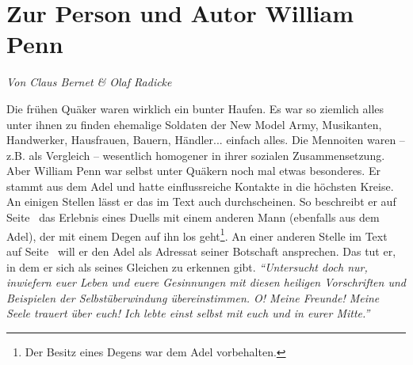 %
%
%



\section{Zur Person und Autor William Penn} \label{ref:zum_autor_penn}

\begin{flushright}
\begin{footnotesize}
\textit{Von Claus Bernet \& Olaf Radicke}
\end{footnotesize}
\end{flushright}
\smallskip

Die frühen Quäker waren wirklich ein bunter Haufen. Es war so ziemlich alles
unter ihnen zu finden ehemalige Soldaten der New Model Army, Musikanten, Handwerker, Hausfrauen, Bauern, Händler... einfach alles.
Die Mennoiten  waren --
z.B. als Vergleich -- wesentlich homogener in ihrer sozialen Zusammensetzung.
Aber
William Penn war selbst unter Quäkern noch mal etwas besonderes. Er stammt aus
dem Adel und hatte einflussreiche Kontakte in die höchsten Kreise. An einigen
Stellen lässt er das im Text auch durchscheinen. So beschreibt er auf
Seite~\pageref{kap9_ab2_duell_penn} das Erlebnis eines Duells
mit einem anderen Mann (ebenfalls aus dem Adel), der mit einem Degen auf ihn los
geht\footnote{Der Besitz eines
Degens war dem Adel vorbehalten.}. An einer anderen Stelle im Text auf
Seite~\pageref{15_04_penn_alte_freunde} will er den Adel als Adressat seiner
Botschaft ansprechen. Das tut er, in dem er sich als seines Gleichen zu erkennen
gibt.
\textit{"`Untersucht doch nur, inwiefern euer Leben und euere Gesinnungen mit
diesen heiligen Vorschriften und Beispielen der Selbstüberwindung
übereinstimmen. O! Meine Freunde! Meine Seele trauert über euch! Ich lebte einst
selbst mit euch und in eurer Mitte."'}

